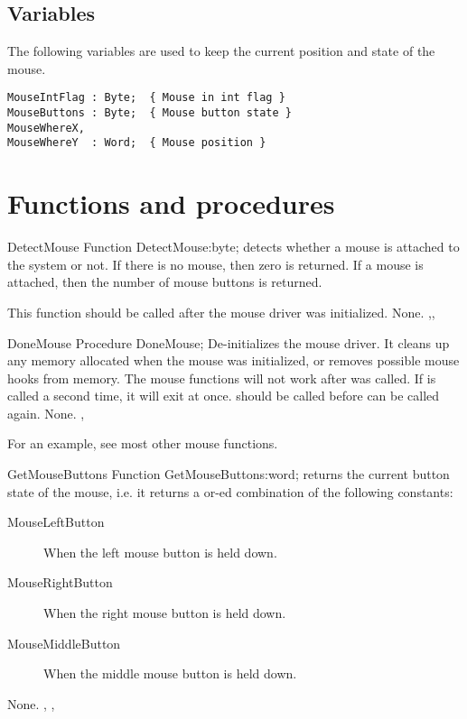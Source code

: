 \subsection{Variables}
The following variables are used to keep the current position and state of
the mouse.
\begin{verbatim}
MouseIntFlag : Byte;  { Mouse in int flag }
MouseButtons : Byte;  { Mouse button state }
MouseWhereX,
MouseWhereY  : Word;  { Mouse position }
\end{verbatim}

\section{Functions and procedures}

\begin{function}{DetectMouse}
\Declaration
Function DetectMouse:byte;
\Description
{} detects whether a mouse is attached to the system or not.
If there is no mouse, then zero is returned. If a mouse is attached, then
the number of mouse buttons is returned.

This function should be called after the mouse driver was initialized.
\Errors
None.
\SeeAlso
{},,
\end{function}


\begin{procedure}{DoneMouse}
\Declaration
Procedure DoneMouse;
\Description
{} De-initializes the mouse driver. It cleans up any memory
allocated when the mouse was initialized, or removes possible mouse hooks
from memory. The mouse functions will not work after  was
called. If  is called a second time, it will exit at once.
 should be called before  can be called again.
\Errors
None.
\SeeAlso
{}, 
\end{procedure}

For an example, see most other mouse functions.

\begin{function}{GetMouseButtons}
\Declaration
Function GetMouseButtons:word;
\Description
{} returns the current button state of the mouse, i.e.
it returns a or-ed combination of the following constants:
\begin{description}
\item[MouseLeftButton] When the left mouse button is held down.
\item[MouseRightButton] When the right mouse button is held down.
\item[MouseMiddleButton] When the middle mouse button is held down.
\end{description}
\Errors
None.
\SeeAlso
{}, , 
\end{function}


